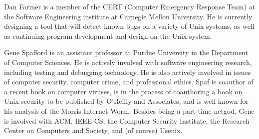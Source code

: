 Dan Farmer is a member of the CERT (Computer Emergency Response
Team) at the Software Engineering institute at Carnegie Mellon
University.  He is currently designing a tool that will 
detect known bugs on a variety of {\sc Unix} systems, as well as continuing
program development and design on the {\sc Unix} system.

Gene Spafford is an assistant professor at Purdue University in the
Department of Computer Sciences.  He is actively involved with
software engineering research, including testing and debugging
technology.  He is also actively involved in issues of computer
security, computer crime, and professional ethics.  Spaf is coauthor
of a recent book on computer viruses, is in the process of coauthoring
a book on {\sc Unix} security to be published by O'Reilly and
Associates, and is well-known for his
analysis of the Morris Internet Worm.
Besides
being a part-time netgod, Gene is involved with ACM, IEEE-CS, the
Computer Security Institute, the Research Center on Computers and
Society, and (of course) Usenix.


